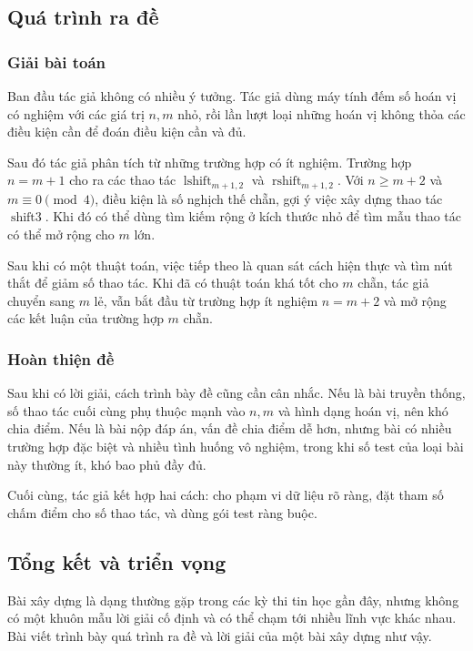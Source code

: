 \documentclass[11pt]{article}
\begin{document}
\subsection{Quá trình ra đề}

\subsubsection{Giải bài toán}

Ban đầu tác giả không có nhiều ý tưởng. Tác giả dùng máy tính đếm số hoán vị có
nghiệm với các giá trị $n,m$ nhỏ, rồi lần lượt loại những hoán vị không thỏa các
điều kiện cần để đoán điều kiện cần và đủ.

Sau đó tác giả phân tích từ những trường hợp có ít nghiệm. Trường hợp $n=m+1$
cho ra các thao tác $\operatorname{lshift}_{m+1,2}$ và
$\operatorname{rshift}_{m+1,2}$. Với $n\ge m+2$ và $m\equiv 0\pmod 4$, điều kiện
là số nghịch thế chẵn, gợi ý việc xây dựng thao tác
$\operatorname{shift3}$. Khi đó có thể dùng tìm kiếm rộng ở kích thước nhỏ để
tìm mẫu thao tác có thể mở rộng cho $m$ lớn.

Sau khi có một thuật toán, việc tiếp theo là quan sát cách hiện thực và tìm nút
thắt để giảm số thao tác. Khi đã có thuật toán khá tốt cho $m$ chẵn, tác giả
chuyển sang $m$ lẻ, vẫn bắt đầu từ trường hợp ít nghiệm $n=m+2$ và mở rộng các
kết luận của trường hợp $m$ chẵn.

\subsubsection{Hoàn thiện đề}

Sau khi có lời giải, cách trình bày đề cũng cần cân nhắc. Nếu là bài truyền
thống, số thao tác cuối cùng phụ thuộc mạnh vào $n,m$ và hình dạng hoán vị, nên
khó chia điểm. Nếu là bài nộp đáp án, vấn đề chia điểm dễ hơn, nhưng bài có
nhiều trường hợp đặc biệt và nhiều tình huống vô nghiệm, trong khi số test của
loại bài này thường ít, khó bao phủ đầy đủ.

Cuối cùng, tác giả kết hợp hai cách: cho phạm vi dữ liệu rõ ràng, đặt tham số
chấm điểm cho số thao tác, và dùng gói test ràng buộc.

\subsection{Tổng kết và triển vọng}

Bài xây dựng là dạng thường gặp trong các kỳ thi tin học gần đây, nhưng không có
một khuôn mẫu lời giải cố định và có thể chạm tới nhiều lĩnh vực khác nhau. Bài
viết trình bày quá trình ra đề và lời giải của một bài xây dựng như vậy.
\end{document}
